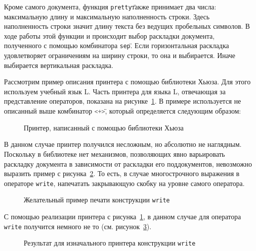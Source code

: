 

Кроме самого документа, функция \"\lstinline[language=Haskell]{pretty}\" также принимает два числа: максимальную длину и максимальную наполненность строки. Здесь наполненность строки значит длину текста без ведущих пробельных символов. В ходе работы этой функции и происходит выбор раскладки документа, полученного с помощью комбинатора \"\lstinline[language=Haskell]{sep}\". Если горизонтальная раскладка удовлетворяет ограничениям на ширину строки, то она и выбирается. Иначе выбирается вертикальная раскладка.



Рассмотрим пример описания принтера с помощью библиотеки Хьюза. Для этого используем учебный язык L. Часть принтера для языка L, отвечающая за представление операторов, показана на рисунке~\ref{fig:lHughesPrinter}.
В примере используется не описанный выше комбинатор \"\lstinline[language=Haskell]{<+>}\", который определяется следующим образом:



\begin{figure}[h!]
	
	\caption{Принтер, написанный с помощью библиотеки Хьюза}
	\label{fig:lHughesPrinter}
\end{figure}

В данном случае принтер получился несложным, но абсолютно не наглядным. Поскольку в библиотеке нет механизмов, позволяющих явно варьировать раскладку документа в зависимости от раскладки его поддокументов, невозможно выразить пример с рисунка~\ref{fig:lGoodWriteEx}.
То есть, в случае многострочного выражения в операторе \lstinline[language=llang]{write}, напечатать закрывающую скобку на уровне самого оператора.

\begin{figure}[h!]
	
	\caption{Желательный пример печати конструкции \lstinline[language=llang]{write}}
	\label{fig:lGoodWriteEx}
\end{figure}

С помощью реализации принтера с рисунка~\ref{fig:lHughesPrinter}, в данном случае для оператора \lstinline[language=llang]{write} получится немного не то (см. рисунок~\ref{fig:lCurWriteEx}).
\begin{figure}[h!]
	
	\caption{Результат для изначального принтера конструкции \lstinline[language=llang]{write}}
	\label{fig:lCurWriteEx}
\end{figure}

